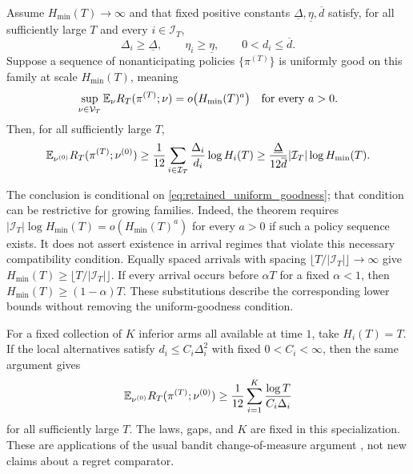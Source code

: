 \documentclass[11pt]{article}
\begin{document}
\begin{theorem}
\label{thm:retained_distractors}
Assume $H_{\min}(T)\to\infty$ and that fixed positive constants
$\underline\Delta,\underline\eta,\overline d$ satisfy, for all sufficiently
large $T$ and every $i\in\mathcal I_T$,
\[
 \Delta_i\ge\underline\Delta,\qquad
 \eta_i\ge\underline\eta,\qquad
 0<d_i\le\overline d.
\]
Suppose a sequence of nonanticipating policies $\{\pi^{(T)}\}$ is uniformly
good on this family at scale $H_{\min}(T)$, meaning
\begin{equation}
 \sup_{\nu\in\mathcal V_T}\mathbb E_\nu
       R_T(\pi^{(T)};\nu)=o\bigl(H_{\min}(T)^a\bigr)
       \quad\text{for every }a>0.
 \label{eq:retained_uniform_goodness}
\end{equation}
Then, for all sufficiently large $T$,
\begin{equation}
 \mathbb E_{\nu^{(0)}}R_T(\pi^{(T)};\nu^{(0)})
 \ge \frac1{12}\sum_{i\in\mathcal I_T}
                 \frac{\Delta_i}{d_i}\log H_i(T)
 \ge \frac{\underline\Delta}{12\overline d}
            |\mathcal I_T|\log H_{\min}(T).
 \label{eq:retained_distractor_lb}
\end{equation}
\end{theorem}

The conclusion is conditional on \eqref{eq:retained_uniform_goodness}; that
condition can be restrictive for growing families. Indeed, the theorem
requires $|\mathcal I_T|\log H_{\min}(T)=o(H_{\min}(T)^a)$ for every $a>0$
if such a policy sequence exists. It does not assert existence in arrival
regimes that violate this necessary compatibility condition. Equally spaced
arrivals with spacing $\lfloor T/|\mathcal I_T|\rfloor\to\infty$ give
$H_{\min}(T)\ge\lfloor T/|\mathcal I_T|\rfloor$. If every arrival occurs
before $\alpha T$ for a fixed $\alpha<1$, then
$H_{\min}(T)\ge(1-\alpha)T$. These substitutions describe the corresponding
lower bounds without removing the uniform-goodness condition.

For a fixed collection of $K$ inferior arms all available at time $1$, take
$H_i(T)=T$. If the local alternatives satisfy
$d_i\le C_i\Delta_i^2$ with fixed $0<C_i<\infty$, then the same argument gives
\begin{equation}
 \mathbb E_{\nu^{(0)}}R_T(\pi^{(T)};\nu^{(0)})
 \ge \frac1{12}\sum_{i=1}^K\frac{\log T}{C_i\Delta_i}
 \label{eq:retained_static_lb}
\end{equation}
for all sufficiently large $T$. The laws, gaps, and $K$ are fixed in this
specialization. These are applications of the usual bandit change-of-measure
argument \citep{kaufmann2016}, not new claims about a regret comparator.
\suppproof
\end{document}
